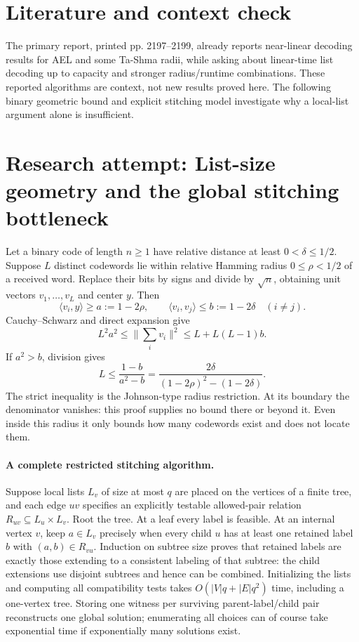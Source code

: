 \documentclass[11pt]{article}
\begin{document}
\section{Literature and context check}
The primary report, printed pp. 2197--2199, already reports near-linear decoding results for AEL and some Ta-Shma radii, while asking about linear-time list decoding up to capacity and stronger radius/runtime combinations. These reported algorithms are context, not new results proved here. The following binary geometric bound and explicit stitching model investigate why a local-list argument alone is insufficient.
\section{Research attempt: List-size geometry and the global stitching bottleneck}

Let a binary code of length $n\geq1$ have relative distance at least $0<\delta\leq1/2$. Suppose $L$ distinct codewords lie within relative Hamming radius $0\leq\rho<1/2$ of a received word. Replace their bits by signs and divide by $\sqrt n$, obtaining unit vectors $v_1,\ldots,v_L$ and center $y$. Then
\[
\langle v_i,y\rangle\geq a:=1-2\rho,
\qquad \langle v_i,v_j\rangle\leq b:=1-2\delta\quad(i\ne j).
\]
Cauchy--Schwarz and direct expansion give
\[
L^2a^2\leq\Big\|\sum_i v_i\Big\|^2
\leq L+L(L-1)b.
\]
If $a^2>b$, division gives
\[
L\leq\frac{1-b}{a^2-b}=\frac{2\delta}{(1-2\rho)^2-(1-2\delta)}.
\]
The strict inequality is the Johnson-type radius restriction. At its boundary the denominator vanishes: this proof supplies no bound there or beyond it. Even inside this radius it only bounds how many codewords exist and does not locate them.

\paragraph{A complete restricted stitching algorithm.}
Suppose local lists $L_v$ of size at most $q$ are placed on the vertices of a finite tree, and each edge $uv$ specifies an explicitly testable allowed-pair relation $R_{uv}\subseteq L_u\times L_v$. Root the tree. At a leaf every label is feasible. At an internal vertex $v$, keep $a\in L_v$ precisely when every child $u$ has at least one retained label $b$ with $(a,b)\in R_{vu}$. Induction on subtree size proves that retained labels are exactly those extending to a consistent labeling of that subtree: the child extensions use disjoint subtrees and hence can be combined. Initializing the lists and computing all compatibility tests takes $O(|V|q+|E|q^2)$ time, including a one-vertex tree. Storing one witness per surviving parent-label/child pair reconstructs one global solution; enumerating all choices can of course take exponential time if exponentially many solutions exist.
\end{document}

